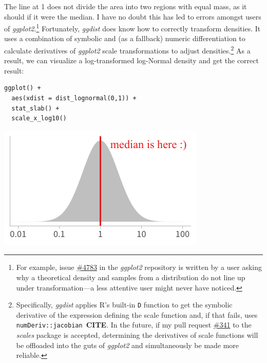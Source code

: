 \documentclass[journal]{vgtc}                     %
\begin{document}
The line at 1 does not divide the area into two regions with equal mass, as it should if it were the median. I have no doubt this has led to errors amongst users of \textit{ggplot2}.\footnote{For example, issue \href{https://github.com/tidyverse/ggplot2/issues/4783}{\#4783} in the \textit{ggplot2} repository is written by a user asking why a theoretical density and samples from a distribution do not line up under transformation---a less attentive user might never have noticed.} Fortunately, \textit{ggdist} does know how to correctly transform densities. It uses a combination of symbolic and (as a fallback) numeric differentiation to calculate derivatives of \textit{ggplot2} scale transformations to adjust densities.\footnote{Specifically, \textit{ggdist} applies R's built-in \texttt{D} function to get the symbolic derivative of the expression defining the scale function and, if that fails, uses \texttt{numDeriv::jacobian}~\textbf{CITE}. In the future, if my pull request \href{https://github.com/r-lib/scales/pull/341}{\#341} to the \textit{scales} package is accepted, determining the derivatives of scale functions will be offloaded into the guts of \textit{ggplot2} and simultaneously be made more reliable.} As a result, we can visualize a log-transformed log-Normal density and get the correct result:

\noindent
\begin{minipage}{.5\columnwidth}
\small
\begin{verbatim}
ggplot() +
  aes(xdist = dist_lognormal(0,1)) +
  stat_slab() +
  scale_x_log10()
\end{verbatim}
\end{minipage}%
  \begin{minipage}{.4\columnwidth}
    \centering
    \includegraphics[width=1.2\columnwidth]{figs/3-jacobian-correct.pdf}
  \end{minipage}
\hfill\break
\end{document}
